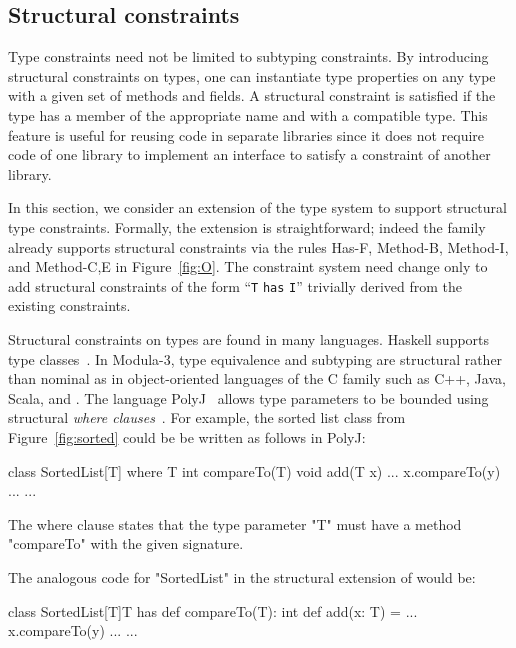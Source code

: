 \subsection{Structural constraints}
\label{sec:structural}
\label{sec:structural-typing}

Type constraints need not be limited to subtyping constraints.
By introducing structural constraints on types, one can
instantiate
type properties on any type with a given set
of methods and fields.
A structural constraint is satisfied if the type has a member of
the appropriate name and with a compatible type.
This feature is useful for reusing code
in separate libraries since it does not require
code of one library to implement an interface to satisfy a
constraint of another library.

In this section, we consider an extension of the \Xten{} type system
to support structural type constraints.  Formally, the extension
is straightforward; indeed the \FX{} family already supports structural constraints
via the rules {\sc Has-F},
{\sc Method-B},
{\sc Method-I},
and
{\sc Method-C,E} in Figure~\ref{fig:O}.
The constraint system need change only to add 
structural
constraints of the form ``{\tt T} {\tt has} {\tt I}''
trivially derived from the existing constraints.

Structural constraints on types are found in many languages.
Haskell supports type
classes~\cite{haskell,haskell-type-classes}.
In Modula-3, type equivalence and subtyping are structural
rather than nominal as in object-oriented languages of the C
family such as C++, Java, Scala, and \Xten{}.
%
The language PolyJ~\cite{java-popl97} allows type parameters to be
bounded using
structural \emph{where clauses}~\cite{where-clauses}.
For example, the sorted list class from Figure~\ref{fig:sorted}
could be
be written as follows in PolyJ:
{\footnotesize
\begin{xten}
class SortedList[T] where T {int compareTo(T)} {
    void add(T x) { ... x.compareTo(y) ... }
    ...
}
\end{xten}}
The where clause states that the type parameter \xcd"T" must have a
method \xcd"compareTo" with the given signature.

The analogous code for \xcd"SortedList" in the structural
extension of \Xten{} would be:
\begin{xten}
class SortedList[T]{T has def compareTo(T): int} {
    def add(x: T) = { ... x.compareTo(y) ... }
    ...
}
\end{xten}

